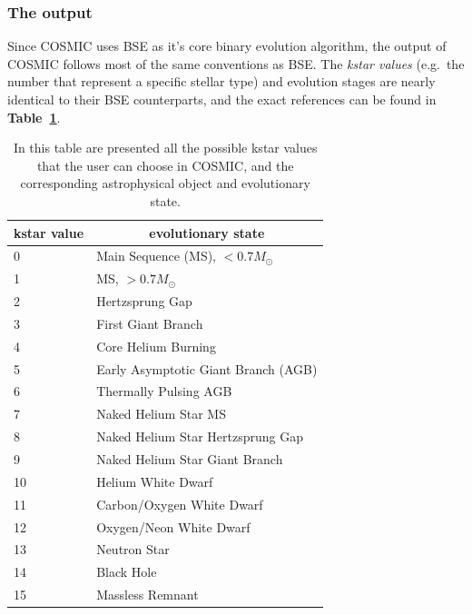 \subsubsection{The output}
Since COSMIC uses BSE as it’s core binary evolution algorithm, the output of COSMIC follows most of the same conventions as BSE. 
The \textit{kstar values} (e.g.\ the number that represent a specific stellar type) and evolution stages are nearly identical to their BSE counterparts, and the exact references can be found in \textbf{Table~\ref{tab: kstar values}}. 
\begin{table}
    \caption{In this table are presented all the possible kstar values that the user can choose in COSMIC, and the corresponding astrophysical object and evolutionary state.}\label{tab: kstar values}
    \begin{center}
        \begin{tabular}[]{l|l}
            \toprule
            \multicolumn{1}{c|}{\textbf{kstar value}} & 
            \multicolumn{1}{c}{\textbf{evolutionary state}} \\
            \midrule
            0 & Main Sequence (MS), $< 0.7 M_\odot$ \\
            1 & MS, $>0.7 M_\odot$ \\
            2 & Hertzsprung Gap \\
            3 & First Giant Branch \\
            4 & Core Helium Burning \\
            5 & Early Asymptotic Giant Branch (AGB) \\
            6 & Thermally Pulsing AGB \\
            7 & Naked Helium Star MS \\
            8 & Naked Helium Star Hertzsprung Gap \\
            9 & Naked Helium Star Giant Branch \\
            10 & Helium White Dwarf \\
            11 & Carbon/Oxygen White Dwarf \\
            12 & Oxygen/Neon White Dwarf \\
            13 & Neutron Star \\
            14 & Black Hole \\
            15 & Massless Remnant \\          
            \bottomrule
        \end{tabular}
    \end{center}
\end{table}
